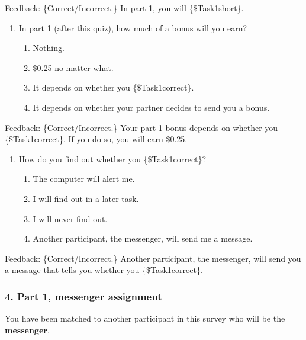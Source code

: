 \begin{description}[listparindent = 1.5em]
Feedback: \{Correct/Incorrect.\} In part 1, you will \{\$Task1short\}.

\item[Part 1 Quiz Question 2] \hspace{1cm}
\begin{enumerate}
\item In part 1 (after this quiz), how much of a bonus will you earn?
\begin{enumerate}
    \item Nothing. 
    \item \$0.25 no matter what. 
    \item It depends on whether you \{\$Task1correct\}.
    \item It depends on whether your partner decides to send you a bonus.
\end{enumerate}
\end{enumerate}

Feedback: \{Correct/Incorrect.\} Your part 1 bonus depends on whether you
\{\$Task1correct\}. If you do so, you will earn \$0.25.

\item[Part 1 Quiz Question 3] \hspace{1cm} 
\begin{enumerate} 
\item How do you find out whether you \{\$Task1correct\}?
\begin{enumerate} 
\item The computer will alert me.
\item I will find out in a later task.
\item I will never find out.
\item Another participant, the messenger, will send me a message.    
\end{enumerate} 
\end{enumerate}

Feedback: \{Correct/Incorrect.\} Another participant, the messenger, will send
you a message that tells you whether you \{\$Task1correct\}.
\end{description}

\subsubsection*{4. Part 1, messenger assignment}

You have been matched to another participant in this survey who will be the
\textbf{messenger}. 

